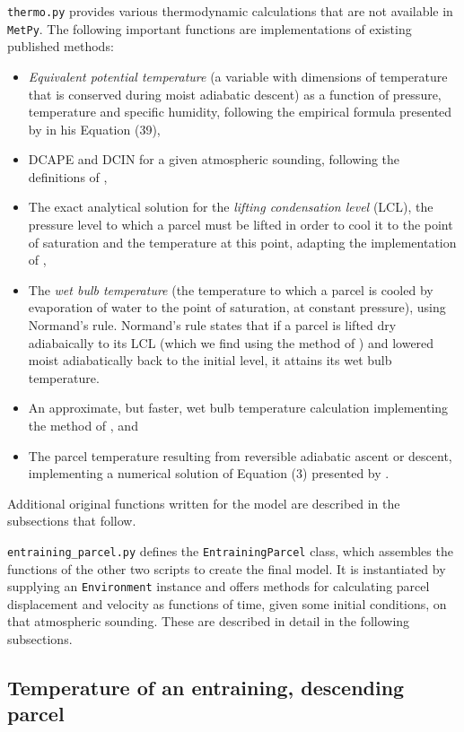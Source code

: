 \documentclass[12pt,titlepage]{article}
\begin{document}
\verb|thermo.py| provides various thermodynamic calculations that
are not available in \verb|MetPy|. The following important functions are
implementations of existing published methods:
\begin{itemize}
	\item \emph{Equivalent potential temperature} (a variable with
		dimensions of temperature that is conserved during moist
		adiabatic descent) as a function of pressure,
		temperature and specific humidity, following the empirical
		formula presented by \textcite{bolton_1980} in his Equation
		(39),
	\item DCAPE and DCIN for a given atmospheric sounding, following
		the definitions of \textcite{market_2017},
	\item The exact analytical solution for the \emph{lifting
		condensation level} (LCL), the pressure level to which a parcel must
		be lifted in order to cool it to the point of saturation and
		the temperature at this point, adapting the implementation
		of \textcite{romps_2017},
	\item The \emph{wet bulb temperature} (the temperature to which
		a parcel is cooled by evaporation of water to the point of
		saturation, at constant pressure), using Normand's rule.
		Normand's rule states that if a parcel is lifted dry
		adiabaically to its LCL (which we find using the method of
		\textcite{romps_2017}) and lowered moist adiabatically back
		to the initial level, it attains its wet bulb temperature.
	\item An approximate, but faster, wet bulb temperature calculation
		implementing the method of \textcite{davies-jones_2008}, and
	\item The parcel temperature resulting from reversible adiabatic
		ascent or descent, implementing a numerical solution of
		Equation (3) presented by \textcite{saunders_1957}.
\end{itemize}
Additional original functions written for the model are described
in the subsections that follow.

\verb|entraining_parcel.py| defines the \verb|EntrainingParcel| class,
which assembles the functions of the other two scripts to create
the final model. It is instantiated by supplying an \verb|Environment|
instance and offers methods for calculating parcel displacement
and velocity as functions of time, given some initial conditions,
on that atmospheric sounding. These are described in detail in
the following subsections.


\subsection{Temperature of an entraining, descending parcel}
\end{document}
